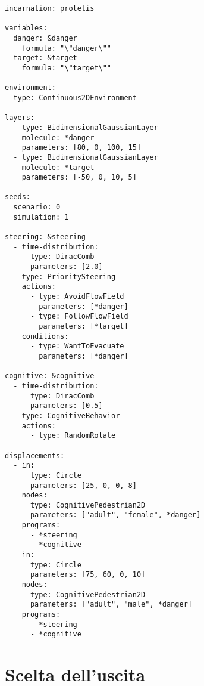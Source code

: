 \begin{verbatim}
incarnation: protelis

variables:
  danger: &danger
    formula: "\"danger\""
  target: &target
    formula: "\"target\""

environment:
  type: Continuous2DEnvironment

layers:
  - type: BidimensionalGaussianLayer
    molecule: *danger
    parameters: [80, 0, 100, 15]
  - type: BidimensionalGaussianLayer
    molecule: *target
    parameters: [-50, 0, 10, 5]

seeds:
  scenario: 0
  simulation: 1

steering: &steering
  - time-distribution:
      type: DiracComb
      parameters: [2.0]
    type: PrioritySteering
    actions:
      - type: AvoidFlowField
        parameters: [*danger]
      - type: FollowFlowField
        parameters: [*target]
    conditions:
      - type: WantToEvacuate
        parameters: [*danger]

cognitive: &cognitive
  - time-distribution:
      type: DiracComb
      parameters: [0.5]
    type: CognitiveBehavior
    actions:
      - type: RandomRotate

displacements:
  - in:
      type: Circle
      parameters: [25, 0, 0, 8]
    nodes:
      type: CognitivePedestrian2D
      parameters: ["adult", "female", *danger]
    programs:
      - *steering
      - *cognitive
  - in:
      type: Circle
      parameters: [75, 60, 0, 10]
    nodes:
      type: CognitivePedestrian2D
      parameters: ["adult", "male", *danger]
    programs:
      - *steering
      - *cognitive
\end{verbatim}

\section{Scelta dell'uscita}

